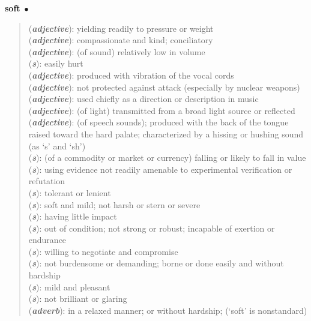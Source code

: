 \documentclass[10pt,a4paper,twoside]{article} %
\newcommand{\entry}[2]{\markboth{#1}{#1}\textbf{#1}\ $\bullet$\ \begin{quote}
		{#2}
		\end{quote}}  %
\begin{document}
\entry{soft}{ (\textbf{\textit{adjective}}): yielding readily to pressure or weight\\ (\textbf{\textit{adjective}}): compassionate and kind; conciliatory\\ (\textbf{\textit{adjective}}): (of sound) relatively low in volume\\ (\textbf{\textit{s}}): easily hurt\\ (\textbf{\textit{adjective}}): produced with vibration of the vocal cords\\ (\textbf{\textit{adjective}}): not protected against attack (especially by nuclear weapons)\\ (\textbf{\textit{adjective}}): used chiefly as a direction or description in music\\ (\textbf{\textit{adjective}}): (of light) transmitted from a broad light source or reflected\\ (\textbf{\textit{adjective}}): (of speech sounds); produced with the back of the tongue raised toward the hard palate; characterized by a hissing or hushing sound (as `s' and `sh')\\ (\textbf{\textit{s}}): (of a commodity or market or currency) falling or likely to fall in value\\ (\textbf{\textit{s}}): using evidence not readily amenable to experimental verification or refutation\\ (\textbf{\textit{s}}): tolerant or lenient\\ (\textbf{\textit{s}}): soft and mild; not harsh or stern or severe\\ (\textbf{\textit{s}}): having little impact\\ (\textbf{\textit{s}}): out of condition; not strong or robust; incapable of exertion or endurance\\ (\textbf{\textit{s}}): willing to negotiate and compromise\\ (\textbf{\textit{s}}): not burdensome or demanding; borne or done easily and without hardship\\ (\textbf{\textit{s}}): mild and pleasant\\ (\textbf{\textit{s}}): not brilliant or glaring\\ (\textbf{\textit{adverb}}): in a relaxed manner; or without hardship;  (`soft' is nonstandard)\\}
\end{document}
